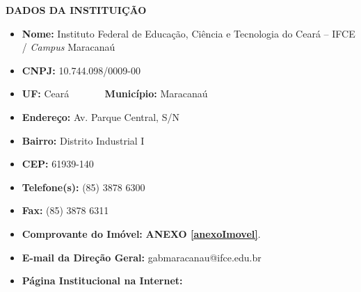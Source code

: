 
\clearpage
\thispagestyle{empty}
\begin{center}
	\textbf{DADOS DA INSTITUIÇÃO}
\end{center}

\vspace{1cm}

\begin{itemize}
	\item \textbf{Nome:} Instituto Federal de Educação, Ciência e Tecnologia do Ceará – IFCE / \textit{Campus} Maracanaú
	
	\item\textbf{CNPJ:} 10.744.098/0009-00
	
	\item \textbf{UF:} {Ceará} ~~~~~~ \textbf{Município: }Maracanaú
	
	\item \textbf{Endereço:} Av. Parque Central, S/N
	
	\item\textbf{Bairro:} Distrito Industrial I
	
	\item\textbf{CEP:} 61939-140
	
	\item\textbf{Telefone(s):} (85) 3878 6300
	
	\item\textbf{Fax:} (85) 3878 6311
	
	\item\textbf{Comprovante do Imóvel: }  \textbf{ANEXO \ref{anexoImovel}}.
	

	\item\textbf{E-mail da Direção Geral:} gabmaracanau@ifce.edu.br
	
	\item\textbf{Página Institucional na Internet:} 
	
\end{itemize}